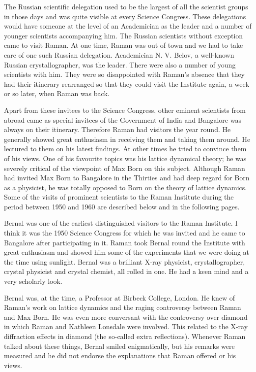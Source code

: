 The Russian scientific delegation used to be the largest of
all the scientist groups in those days and was quite visible at every
Science Congress. These delegations would have someone at the
level of an Academician as the leader and a number of younger
scientists accompanying him. The Russian scientists without
exception came to visit Raman. At one time, Raman was out of
town and we had to take care of one such Russian delegation.
Academician N. V. Belov, a well-known Russian crystallographer,
was the leader. There were also a number of young scientists with
him. They were so disappointed with Raman's absence that they
had their itinerary rearranged so that they could visit the Institute
again, a week or so later, when Raman was back.

Apart from these invitees to the Science Congress, other
eminent scientists from abroad came as special invitees of the
Government of India and Bangalore was always on their itinerary.
Therefore Raman had visitors the year round. He generally
showed great enthusiasm in receiving them and taking them
around. He lectured to them on his latest findings. At other times
he tried to convince them of his views. One of his favourite topics
was his lattice dynamical theory; he was severely critical of the
viewpoint of Max Born on this subject. Although Raman had
invited Max Born to Bangalore in the Thirties and had deep regard
for Born as a physicist, he was totally opposed to Born on the
theory of lattice dynamics. Some of the visits of prominent
scientists to the Raman Institute during the period between 1950
and 1960 are described below and in the following pages.

\medskip
{}
\smallskip

\noindent
Bernal was one of the earliest distinguished visitors to the
Raman Institute. I think it was the 1950 Science Congress for
which he was invited and he came to Bangalore after participating
in it. Raman took Bernal round the Institute with great enthusiasm
and showed him some of the experiments that we were doing at
the time using sunlight. Bernal was a brilliant X-ray physicist,
crystallographer, crystal physicist and crystal chemist, all rolled
in one. He had a keen mind and a very scholarly look.

Bernal was, at the time, a Professor at Birbeck College,
London. He knew of Raman's work on lattice dynamics and the
raging controversy between Raman and Max Born. He was even
more conversant with the controversy over diamond in which
Raman and Kathleen Lonsdale were involved. This related to the
X-ray diffraction effects in diamond (the so-called extra
reflections). Whenever Raman talked about these things, Bernal
smiled enigmatically, but his remarks were measured and he did
not endorse the explanations that Raman offered or his views.

